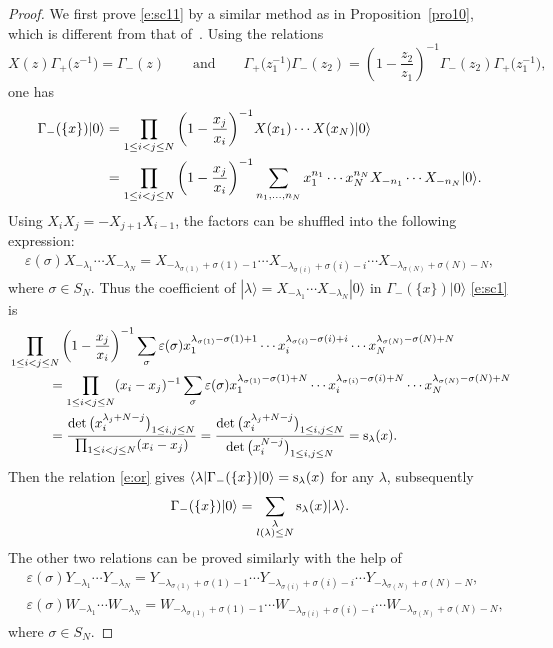 \documentclass[10pt,a4paper]{amsart}
\numberwithin{equation}{section}
\begin{document}
\begin{proof}
We first prove \eqref{e:sc11} by a similar method as in Proposition~\ref{pro10}, which is different from that of~\cite{JL2020}.
Using the relations
\[
X(z)\Gamma_+\big(z^{-1}\big)=\Gamma_-(z) \qquad \text{and}\qquad \Gamma_+\big(z^{-1}_1\big)\Gamma_-(z_2)=\left(1-\frac{z_2}{z_1}\right)^{-1}\Gamma_-(z_2)\Gamma_+\big(z^{-1}_1\big),
\]
one has
\begin{align}
\Gamma_-(\{x\})|0\rangle&{}=\prod_{1\leq i<j\leq N}\bigg(1-\frac{x_j}{x_i}\bigg)^{-1}X(x_1)\cdots X(x_N)|0\rangle\notag\\
&{}=\prod_{1\leq i<j\leq N}\bigg(1-\frac{x_j}{x_i}\bigg)^{-1}\sum_{n_1,\dots,n_N}x^{n_1}_1\cdots x^{n_N}_NX_{-n_1}\cdots X_{-n_N}|0\rangle.\label{e:sc1}
\end{align}
 Using $X_iX_j=-X_{j+1}X_{i-1}$, the factors can be shuffled into the following expression:
\begin{align}\label{e:sc15}
\varepsilon(\sigma)X_{-\lambda_1}\cdots X_{-\lambda_N}=X_{-\lambda_{\sigma(1)}+\sigma(1)-1}\cdots X_{-\lambda_{\sigma(i)}+\sigma(i)-i}\cdots X_{-\lambda_{\sigma(N)}+\sigma(N)-N},
\end{align}
where $\sigma\in S_N$. Thus the coefficient of $|\lambda\rangle=X_{-\lambda_1}\cdots X_{-\lambda_N}|0\rangle$ in $\Gamma_-(\{x\})|0\rangle$ \eqref{e:sc1} is
\begin{align*}
&\prod_{1\leq i<j\leq N}\bigg(1-\frac{x_j}{x_i}\bigg)^{-1}\sum_{\sigma}\varepsilon(\sigma)x^{\lambda_{\sigma(1)}-\sigma(1)+1}_1\cdots x^{\lambda_{\sigma(i)}-\sigma(i)+i}_i\cdots x^{\lambda_{\sigma(N)}-\sigma(N)+N}_N\\
&\qquad\quad{}=\prod_{1\leq i<j\leq N} (x_i-x_j)^{-1}\sum_{\sigma}\varepsilon(\sigma)x^{\lambda_{\sigma(1)}-\sigma(1)+N}_1\cdots x^{\lambda_{\sigma(i)}-\sigma(i)+N}_i\cdots x^{\lambda_{\sigma(N)}-\sigma(N)+N}_N\\
&\qquad\quad{}=\frac{\det\big(x^{\lambda_j+N-j}_i\big)_{1\leq i,j\leq N}}{\prod_{1\leq i<j\leq N} (x_i-x_j)}
 = \frac{\det\big(x^{\lambda_j+N-j}_i\big)_{1\leq i,j\leq N}}{\det\big(x^{N-j}_i\big)_{1\leq i,j\leq N}} = {\rm s}_\lambda(x).
\end{align*}
Then the relation \eqref{e:or} gives $\langle\lambda|\Gamma_-(\{x\})|0\rangle={\rm s}_\lambda(x)$ for any $\lambda$, subsequently
\begin{align*}
\Gamma_-(\{x\})|0\rangle=\sum_{\substack{\lambda\\l(\lambda)\leq N}}{\rm s}_\lambda(x)|\lambda\rangle.
\end{align*}
The other two relations can be proved similarly with the help of
\begin{align}
&\varepsilon(\sigma)Y_{-\lambda_1}\cdots Y_{-\lambda_N}=Y_{-\lambda_{\sigma(1)}+\sigma(1)-1}\cdots Y_{-\lambda_{\sigma(i)}+\sigma(i)-i}\cdots Y_{-\lambda_{\sigma(N)}+\sigma(N)-N},\nonumber\\
&\varepsilon(\sigma)W_{-\lambda_1}\cdots W_{-\lambda_N}=W_{-\lambda_{\sigma(1)}+\sigma(1)-1}\cdots W_{-\lambda_{\sigma(i)}+\sigma(i)-i}\cdots W_{-\lambda_{\sigma(N)}+\sigma(N)-N},\label{e:sp1}
\end{align}
where $\sigma\in S_N$.
\end{proof}
\end{document}
